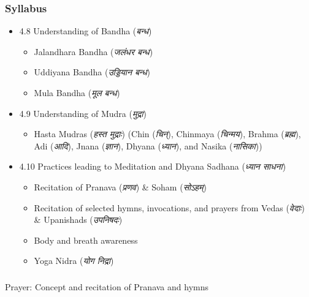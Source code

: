 \begin{frame}[fragile]\frametitle{Syllabus}

\begin{itemize}
\item 4.8  Understanding of Bandha (\textit{बन्ध})
	\begin{itemize}
	\item Jalandhara Bandha (\textit{जलंधर बन्ध})
	\item Uddiyana Bandha (\textit{उड्डियान बन्ध})
	\item Mula Bandha (\textit{मूल बन्ध})
	\end{itemize}

\item 4.9  Understanding of Mudra (\textit{मुद्रा})   
	\begin{itemize}
	\item Hasta Mudras (\textit{हस्त मुद्राः}) (Chin (\textit{चिन्}), Chinmaya (\textit{चिन्मय}), Brahma (\textit{ब्रह्म}), Adi (\textit{आदि}), Jnana (\textit{ज्ञान}), Dhyana (\textit{ध्यान}), and Nasika (\textit{नासिका}))
	\end{itemize}
	
\item 4.10  Practices leading to Meditation and Dhyana Sadhana (\textit{ध्यान साधना})   
	\begin{itemize}
	\item  Recitation of Pranava (\textit{प्रणव}) \& Soham (\textit{सोऽहम्}) 
	\item  Recitation of selected hymns, invocations, and prayers from Vedas (\textit{वेदाः}) \& Upanishads (\textit{उपनिषदः})
	\item  Body and breath awareness  
	\item  Yoga Nidra (\textit{योग निद्रा})
	\end{itemize}
	
\end{itemize}
\end{frame}


\begin{frame}[fragile]\frametitle{}
\begin{center}
{\Large  Prayer: Concept and recitation of Pranava and hymns}
\end{center}
\end{frame}


